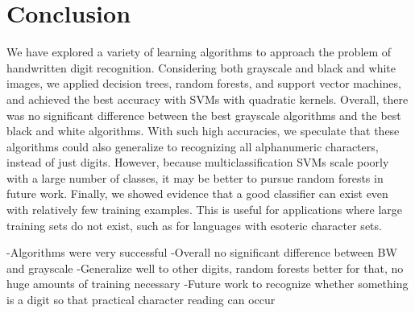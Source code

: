 \documentclass[12pt]{article}
\begin{document}
\section*{Conclusion}
We have explored a variety of learning algorithms to approach the problem of handwritten digit recognition. Considering both grayscale and black and white images, we applied decision trees, random forests, and support vector machines, and achieved the best accuracy with SVMs with quadratic kernels. Overall, there was no significant difference between the best grayscale algorithms and the best black and white algorithms. With such high accuracies, we speculate that these algorithms could also generalize to recognizing all alphanumeric characters, instead of just digits. However, because multiclassification SVMs scale poorly with a large number of classes, it may be better to pursue random forests in future work. Finally, we showed evidence that a good classifier can exist even with relatively few training examples. This is useful for applications where large training sets do not exist, such as for languages with esoteric character sets.

-Algorithms were very successful
-Overall no significant difference between BW and grayscale
-Generalize well to other digits, random forests better for that, no huge amounts of training necessary
-Future work to recognize whether something is a digit so that practical character reading can occur
\end{document}
